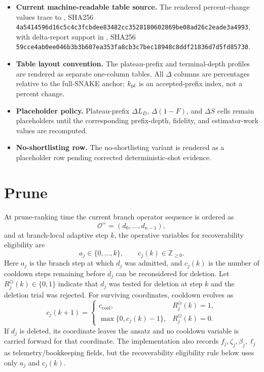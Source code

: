 \documentclass[
  reprint,
  amsmath,
  amssymb,
  aps,
  pra,
  nofootinbib,
  superscriptaddress,
  floatfix
]{revtex4-2}
\begin{document}
\begin{itemize}
\item \textbf{Current machine-readable table source.} The rendered percent-change values trace to , SHA256 \texttt{4a5414596d16c5c4c3fcbdee83482cc3528180602869be08ad26c2eade3a4993}, with delta-report support in , SHA256 \texttt{59cce4ab0ee046b3b3b607ea353fa8cb3c7bec18948c8ddf21836d7d5fd85730}.
\item \textbf{Table layout convention.} The plateau-prefix and terminal-depth profiles are rendered as separate one-column tables. All \(\Delta\) columns are percentages relative to the full-SNAKE anchor; \(k_{\rm pl}\) is an accepted-prefix index, not a percent change.
\item \textbf{Placeholder policy.} Plateau-prefix \(\Delta L_D\), \(\Delta(1-F)\), and \(\Delta S\) cells remain placeholders until the corresponding prefix-depth, fidelity, and estimator-work values are recomputed.
\item \textbf{No-shortlisting row.} The no-shortlisting variant is rendered as a placeholder row pending corrected deterministic-shot evidence.
\end{itemize}

\fi

\section{Prune}
\label{app:prune}

At prune-ranking time the current branch operator sequence is ordered as
\[
\mathcal O^{+}=(d_0,\ldots,d_{n-1}),
\]
and at branch-local adaptive step \(k\), the operative variables for recoverability eligibility are
\[
a_j\in\{0,\ldots,k\},
\qquad
c_j(k)\in\mathbb Z_{\ge0}.
\]
Here \(a_j\) is the branch step at which \(d_j\) was admitted, and \(c_j(k)\) is the number of cooldown steps remaining before \(d_j\) can be reconsidered for deletion.  Let \(R_j^\ominus(k)\in\{0,1\}\) indicate that \(d_j\) was tested for deletion at step \(k\) and the deletion trial was rejected.  For surviving coordinates, cooldown evolves as
\[
c_j(k+1)
=
\begin{cases}
c_{\mathrm{cool}}, & R_j^\ominus(k)=1,\\
\max\{0,c_j(k)-1\}, & R_j^\ominus(k)=0.
\end{cases}
\]
If \(d_j\) is deleted, its coordinate leaves the ansatz and no cooldown variable is carried forward for that coordinate.  The implementation also records \(f_j,\zeta_j,\beta_j,\ell_j\) as telemetry/bookkeeping fields, but the recoverability eligibility rule below uses only \(a_j\) and \(c_j(k)\).
\end{document}
